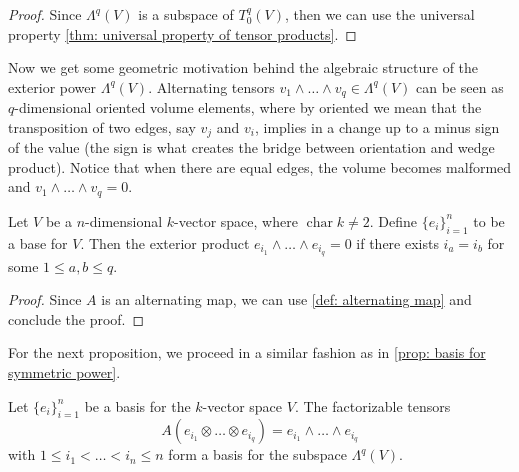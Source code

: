 \begin{proof}
  Since \(\Lambda^q(V)\) is a subspace of \(T_0^q(V)\), then we can use the
  universal property \cref{thm: universal property of tensor products}.
\end{proof}

Now we get some geometric motivation behind the algebraic structure of the
exterior power \(\Lambda^q(V)\). Alternating tensors \(v_1 \wedge \dots \wedge
v_q \in \Lambda^q(V)\) can be seen as \(q\)-dimensional oriented volume elements,
where by oriented we mean that the transposition of two edges, say \(v_j\) and
\(v_i\), implies in a change up to a minus sign of the value (the sign is what
creates the bridge between orientation and wedge product). Notice that when
there are equal edges, the volume becomes malformed and \(v_1 \wedge \dots
\wedge v_q = 0\).

\begin{proposition}
  Let \(V\) be a \(n\)-dimensional \(k\)-vector space, where
  \(\operatorname{char} k \neq 2\). Define \(\{e_i\}_{i=1}^n\) to be a base for
  \(V\). Then the exterior product \(e_{i_1} \wedge \dots \wedge e_{i_q} = 0\)
  if there exists \(i_a = i_b\) for some \(1 \leq a, b \leq q\).
\end{proposition}

\begin{proof}
  Since \(A\) is an alternating map, we can use \cref{def: alternating map} and
  conclude the proof.
\end{proof}

For the next proposition, we proceed in a similar fashion as in \cref{prop:
basis for symmetric power}.

\begin{proposition}
  \label{prop: exterior power basis}
  Let \(\{e_i\}_{i=1}^n\) be a basis for the \(k\)-vector space \(V\). The
  factorizable tensors
  \[
    A(e_{i_1} \otimes \dots \otimes e_{i_q}) = e_{i_1} \wedge \dots \wedge
    e_{i_q}
  \]
  with \(1 \leq i_1 < \dots < i_n \leq n\) form a basis for the subspace
  \(\Lambda^q(V)\).
\end{proposition}

